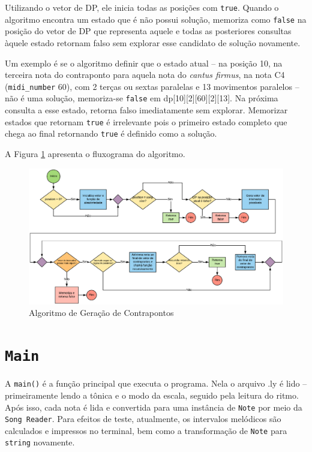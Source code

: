     Utilizando o vetor de DP, ele inicia todas as posições com \texttt{true}. Quando o algoritmo encontra um estado que é não possui solução, memoriza como \texttt{false} na posição do vetor de DP que representa aquele e todas as posteriores consultas àquele estado retornam falso sem explorar esse candidato de solução novamente.

    Um exemplo é se o algoritmo definir que o estado atual -- na posição 10, na terceira nota do contraponto para aquela nota do \textit{cantus firmus}, na nota C4 (\texttt{midi\_number} 60), com 2 terças ou sextas paralelas e 13 movimentos paralelos -- não é uma solução, memoriza-se \texttt{false} em dp[10][2][60][2][13]. Na próxima consulta a esse estado, retorna falso imediatamente sem explorar. Memorizar estados que retornam \texttt{true} é irrelevante pois o primeiro estado completo que chega ao final retornando \texttt{true} é definido como a solução.

    A Figura \ref{algoritmo} apresenta o fluxograma do algoritmo.

    \begin{figure}[htb]
      \centering
      \includegraphics[scale=0.6]{figuras/algoritmo.eps}
      \caption{Algoritmo de Geração de Contrapontos}
      \label{algoritmo}
    \end{figure}


  \section[\texttt{Main}]{\texttt{Main}}

    A \texttt{main()} é a função principal que executa o programa. Nela o arquivo .ly é lido -- primeiramente lendo a tônica e o modo da escala, seguido pela leitura do ritmo. Após isso, cada nota é lida e convertida para uma instância de \texttt{Note} por meio da \texttt{Song Reader}. Para efeitos de teste, atualmente, os intervalos melódicos são calculados e impressos no terminal, bem como a transformação de \texttt{Note} para \texttt{string} novamente.

